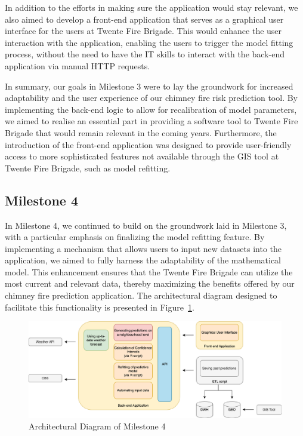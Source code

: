 \documentclass{utitcphd_overleaf}
\begin{document}
In addition to the efforts in making sure the application would stay relevant, we also aimed to develop a front-end application that serves as a graphical user interface for the users at Twente Fire Brigade. This would enhance the user interaction with the application, enabling the users to trigger the model fitting process, without the need to have the IT skills to interact with the back-end application via manual HTTP requests.

In summary, our goals in Milestone 3 were to lay the groundwork for increased adaptability and the user experience of our chimney fire risk prediction tool. By implementing the back-end logic to allow for recalibration of model parameters, we aimed to realise an essential part in providing a software tool to Twente Fire Brigade that would remain relevant in the coming years. Furthermore, the introduction of the front-end application was designed to provide user-friendly access to more sophisticated features not available through the GIS tool at Twente Fire Brigade, such as model refitting.

\subsection{Milestone 4}

In Milestone 4, we continued to build on the groundwork laid in Milestone 3, with a particular emphasis on finalizing the model refitting feature. By implementing a mechanism that allows users to input new datasets into the application, we aimed to fully harness the adaptability of the mathematical model. This enhancement ensures that the Twente Fire Brigade can utilize the most current and relevant data, thereby maximizing the benefits offered by our chimney fire prediction application. The architectural diagram designed to facilitate this functionality is presented in Figure~\ref{fig:iteration_4_arch}.

\begin{figure}[ht]
  \centering
  \includegraphics[width=1\textwidth]{my_images/milestones/iteration_4_arch.pdf}
  \caption{Architectural Diagram of Milestone 4}
  \label{fig:iteration_4_arch}
\end{figure}
\end{document}
